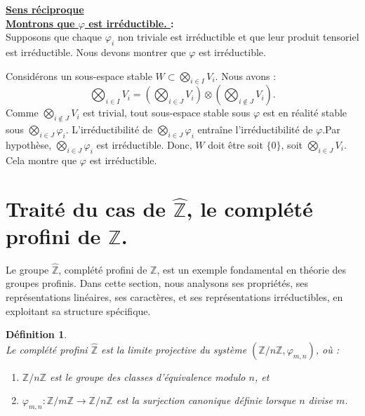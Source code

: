 \documentclass[a4paper, 14pt]{report}
\newtheorem{definition}{Définition}[section]
\begin{document}
\begin{onehalfspace}
{\begin{enumerate} [label=\roman*)]
				\textbf{\underline{	Sens réciproque}}\\
				
				\textbf{\underline{Montrons que \( \varphi \) est irréductible. } :}\\	
				Supposons que chaque \( \varphi_i \) non triviale est irréductible et que leur produit tensoriel est irréductible.  
				Nous devons montrer que \( \varphi \) est irréductible.
				
				Considérons un sous-espace stable \( W \subset \bigotimes_{i \in I} V_i \).
				Nous avons :
				\[
				\bigotimes_{i \in I} V_i = \left( \bigotimes_{i \in J} V_i \right) \otimes \left( \bigotimes_{i \notin J} V_i \right).
				\]
				Comme \( \bigotimes_{i \notin J} V_i \) est trivial, tout sous-espace stable sous \( \varphi \) est en réalité stable sous \( \bigotimes_{i \in J} \varphi_i \).  
				L'irréductibilité de \( \bigotimes_{i \in J} \varphi_i \) entraîne l'irréductibilité de \( \varphi \).Par hypothèse, \( \bigotimes_{i \in J} \varphi_i \) est irréductible. Donc, \( W \) doit être soit \( \{0\} \), soit \( \bigotimes_{i \in J} V_i \).  
				Cela montre que \( \varphi \) est irréductible.
			\end{enumerate}
			
			
			
			\section{Traité du cas de $\widehat{\mathbb{Z}}$, le complété profini de $\mathbb{Z}$.}
			Le groupe \( \widehat{\mathbb{Z}} \), complété profini de \( \mathbb{Z} \), est un exemple fondamental en théorie des groupes profinis. Dans cette section, nous analysons ses propriétés, ses représentations linéaires, ses caractères, et ses représentations irréductibles, en exploitant sa structure spécifique.
			
			\begin{definition} \cite{ribes-zalesskii}\\
				Le complété profini $\widehat{\mathbb{Z}}$ est la limite projective du système $(\mathbb{Z}/n\mathbb{Z}, \varphi_{m,n})$, où :
				\begin{enumerate} [label=\roman*)]
					\item $\mathbb{Z}/n\mathbb{Z}$  est le groupe des classes d’équivalence modulo $n$, et
					\item $\varphi_{m,n} : \mathbb{Z}/m\mathbb{Z} \to \mathbb{Z}/n\mathbb{Z}$ est la surjection canonique définie lorsque $n$ divise $m$.
				\end{enumerate}
			\end{definition}
			
}
\end{onehalfspace}
\end{document}

